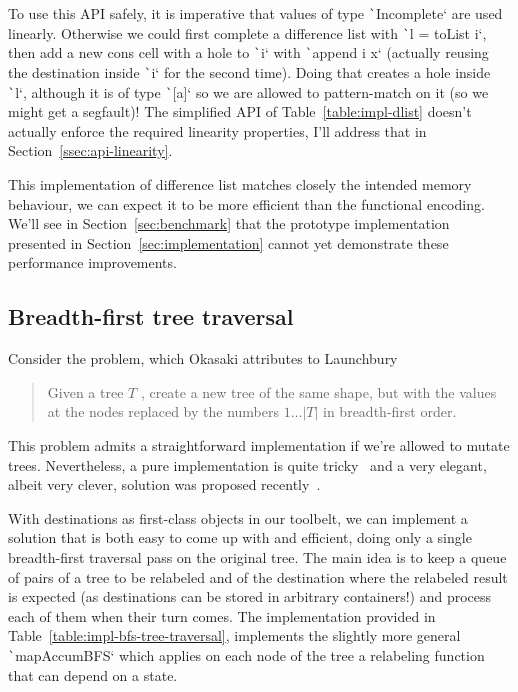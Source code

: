 \documentclass[english]{jflart}
\begin{document}
To use this API safely, it is imperative that values of type \texttt`Incomplete` are used linearly. Otherwise we could first complete a difference list with \texttt`l = toList i`, then add a new cons cell with a hole to \texttt`i` with \texttt`append i x` (actually reusing the destination inside \texttt`i` for the second time). Doing that creates a hole inside \texttt`l`, although it is of type \texttt`[a]` so we are allowed to pattern-match on it (so we might get a segfault)! The simplified API of Table~\ref{table:impl-dlist} doesn't actually enforce the required linearity properties, I'll address that in Section~\ref{ssec:api-linearity}.

This implementation of difference list matches closely the intended memory behaviour, we can expect it to be more efficient than the functional encoding. We'll see in Section~\ref{sec:benchmark} that the prototype implementation presented in Section~\ref{sec:implementation} cannot yet demonstrate these performance improvements.

\subsection{Breadth-first tree traversal}\label{ssec:bf-tree-traversal}

Consider the problem, which Okasaki attributes to Launchbury~\cite{okasaki_bfs_2000}
\begin{quote}
  Given a tree $T$ , create a new tree of the same
  shape, but with the values at the nodes replaced
  by the numbers $1\ldots|T|$ in breadth-first order.
\end{quote}

This problem admits a straightforward implementation if we're allowed
to mutate trees. Nevertheless, a pure implementation is quite
tricky~\cite{okasaki_bfs_2000,jones_gibbons_linearbfs_93} and a very
elegant, albeit very clever, solution was proposed
recently~\cite{gibbons_phases_2023}.



With destinations as first-class objects in our toolbelt, we can
implement a solution that is both easy to come up with and efficient,
doing only a single breadth-first traversal pass on the original
tree. The main idea is to keep a queue of pairs of a tree to be
relabeled and of the destination where the relabeled result is
expected (as destinations can be stored in arbitrary containers!) and
process each of them when their turn comes. The implementation
provided in Table~\ref{table:impl-bfs-tree-traversal}, implements the
slightly more general \texttt`mapAccumBFS` which applies
on each node of the tree a relabeling function that can depend on a
state.
\end{document}
